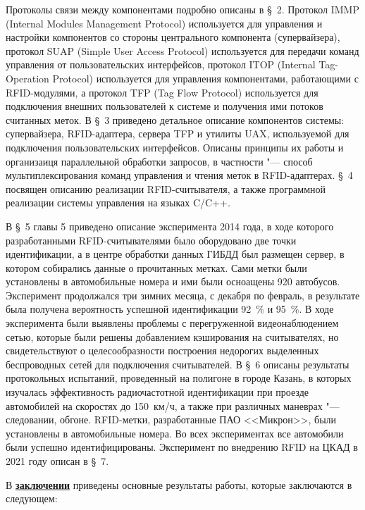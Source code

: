 Протоколы связи между компонентами подробно описаны в \S~2. Протокол IMMP (Internal Modules Management Protocol) используется для управления и настройки компонентов со стороны центрального компонента (супервайзера), протокол SUAP (Simple User Access Protocol) используется для передачи команд управления от пользовательских интерфейсов, протокол ITOP (Internal Tag-Operation Protocol) используется для управления компонентами, работающими с RFID-модулями, а протокол TFP (Tag Flow Protocol) используется для подключения внешних пользователей к системе и получения ими потоков считанных меток.  В \S~3 приведено детальное описание компонентов системы: супервайзера, RFID-адаптера, сервера TFP и утилиты UAX, используемой для подключения пользовательских интерфейсов. Описаны принципы их работы и организаиця параллельной обработки запросов, в частности "--- способ мультиплексирования команд управления и чтения меток в RFID-адаптерах. \S~4 посвящен описанию реализации RFID-считывателя, а также программной реализации системы управления на языках C/C++.

В \S~5 главы 5 приведено описание эксперимента 2014 года, в ходе которого разработанными RFID-считывателями было оборудовано две точки идентификации, а в центре обработки данных ГИБДД был размещен сервер, в котором собирались данные о прочитанных метках. Сами метки были установлены в автомобильные номера и ими были осноащены 920 автобусов. Эксперимент продолжался три зимних месяца, с декабря по февраль, в результате была получена вероятность успешной идентификации 92~\% и 95~\%. В ходе эксперимента были выявлены проблемы с перегруженной видеонаблюдением сетью, которые были решены добавлением кэширования на считывателях, но свидетельствуют о целесообразности построения недорогих выделенных беспроводных сетей для подключения считывателей. В \S~6 описаны результаты протокольных испытаний, проведенный на полигоне в городе Казань, в которых изучалась эффективность радиочастотной идентификации при проезде автомобилей на скоростях до 150~км/ч, а также при различных маневрах "--- следовании, обгоне. RFID-метки, разработанные ПАО <<Микрон>>, были установлены в автомобильные номера. Во всех экспериментах все автомобили были успешно идентифицированы. Эксперимент по внедрению RFID на ЦКАД в 2021 году описан в \S~7.


\FloatBarrier
{}                                  %
В \underline{\textbf{заключении}} приведены основные результаты работы, которые заключаются в следующем:


